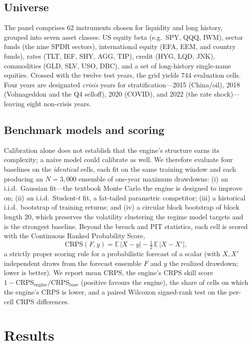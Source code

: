 \documentclass[11pt]{article}
\newcommand{\E}{\mathbb{E}}
\begin{document}
\subsection{Universe}
The panel comprises 62 instruments chosen for liquidity and long history, grouped
into seven asset classes: US equity beta (e.g.\ SPY, QQQ, IWM), sector funds
(the nine SPDR sectors), international equity (EFA, EEM, and country funds), rates
(TLT, IEF, SHY, AGG, TIP), credit (HYG, LQD, JNK), commodities (GLD, SLV, USO,
DBC), and a set of long-history single-name equities. Crossed with the twelve test
years, the grid yields $744$ evaluation cells. Four years are designated
\emph{crisis} years for stratification---2015 (China/oil), 2018 (Volmageddon and
the Q4 selloff), 2020 (COVID), and 2022 (the rate shock)---leaving eight
non-crisis years.

\subsection{Benchmark models and scoring}
\label{sec:benchmethod}
Calibration alone does not establish that the engine's structure earns its
complexity; a naive model could calibrate as well. We therefore evaluate four
baselines on the \emph{identical} cells, each fit on the same training window and
each producing an $N=3{,}000$ ensemble of one-year maximum drawdowns: (i) an
i.i.d.\ Gaussian fit---the textbook Monte Carlo the engine is designed to
improve on; (ii) an i.i.d.\ Student-$t$ fit, a fat-tailed parametric competitor;
(iii) a historical i.i.d.\ bootstrap of training returns; and (iv) a circular
block bootstrap of block length $20$, which preserves the volatility clustering
the regime model targets and is the strongest baseline. Beyond the breach and PIT
statistics, each cell is scored with the Continuous Ranked Probability Score,
\[
  \mathrm{CRPS}(F, y) = \E\,|X - y| - \tfrac12\,\E\,|X - X'|,
\]
a strictly proper scoring rule for a probabilistic forecast of a scalar (with
$X,X'$ independent draws from the forecast ensemble $F$ and $y$ the realized
drawdown; lower is better). We report mean CRPS, the engine's CRPS skill score
$1 - \overline{\mathrm{CRPS}}_{\mathrm{engine}} /
\overline{\mathrm{CRPS}}_{\mathrm{base}}$ (positive favours the engine), the share
of cells on which the engine's CRPS is lower, and a paired Wilcoxon signed-rank
test on the per-cell CRPS differences.

\section{Results}
\end{document}
